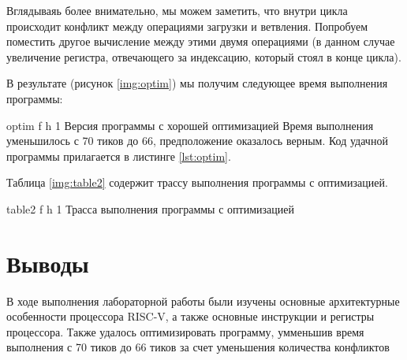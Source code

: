 

Вглядываяь более внимательно, мы можем заметить, что внутри цикла происходит конфликт между операциями загрузки и ветвления.
Попробуем поместить другое вычисление между этими двумя операциями (в данном случае увеличение регистра, отвечающего за индексацию, который стоял в конце цикла).

В результате (рисунок \ref{img:optim}) мы получим следующее время выполнения программы:

{optim}
{f}
{h}
{1\textwidth}
{Версия программы с хорошей оптимизацией}
\clearpage
Время выполнения уменьшилось с 70 тиков до 66, предположение оказалось верным. Код удачной программы прилагается в листинге \ref{lst:optim}.



Таблица \ref{img:table2} содержит трассу выполнения программы с оптимизацией.

{table2}
{f}
{h}
{1\textwidth}
{Трасса выполнения программы с оптимизацией}
\clearpage

\section{Выводы}

В ходе выполнения лабораторной работы были изучены основные архитектурные особенности процессора RISC-V, а также основные инструкции и регистры процессора.
Также удалось оптимизировать программу, умменьшив время выполнения с 70 тиков до 66 тиков за счет уменьшения количества конфликтов